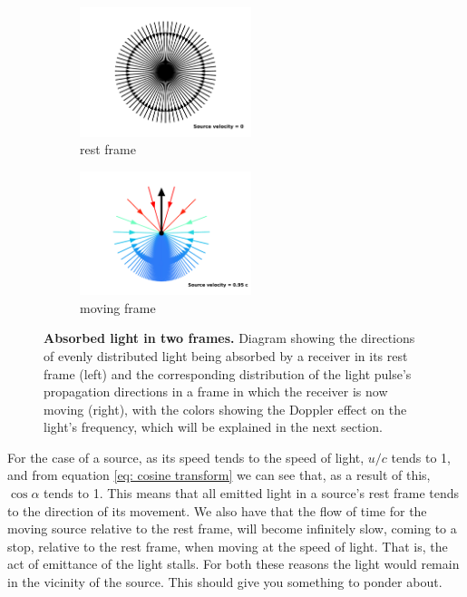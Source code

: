 \begin{figure}[H]
	\begin{subfigure}{.49\textwidth}
		\centering
		\includegraphics[width = 5cm]{images/pdf/Aberrated_velocities_inwards_restframe.pdf}
		\caption{rest frame}
	\end{subfigure}
	\begin{subfigure}{.49\textwidth}
		\centering
		\includegraphics[width = 5cm]{images/pdf/Aberrated_velocities_inwards.pdf}
		\caption{moving frame}
	\end{subfigure}
	\caption{\textbf{Absorbed light in two frames.} Diagram showing the directions of evenly distributed light being absorbed by a receiver in its rest frame (left) and the corresponding distribution of the light pulse's propagation directions in a frame in which the receiver is now moving (right), with the colors showing the Doppler effect on the light's frequency, which will be explained in the next section.}
	\label{fig: aberrated absorbed light}
\end{figure}

For the case of a source, as its speed tends to the speed of light, $u/c$ tends to 1, and from equation \eqref{eq: cosine transform} we can see that, as a result of this, $\cos\alpha$ tends to 1.
This means that all emitted light in a source's rest frame tends to the direction of its movement.
We also have that the flow of time for the moving source relative to the rest frame, will become infinitely slow, coming to a stop, relative to the rest frame, when moving at the speed of light.
That is, the act of emittance of the light stalls.
For both these reasons the light would remain in the vicinity of the source.
This should give you something to ponder about.

